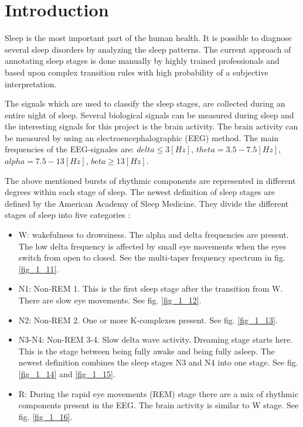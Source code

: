 \section{Introduction}
\label{sec:intro}

Sleep is the most important part of the human health. It is possible to diagnose several sleep disorders by analyzing the sleep patterns.
The current approach of annotating sleep stages is done manually by highly trained professionals and based upon complex transition rules with high probability of a subjective interpretation.

The signals which are used to classify the sleep stages, are collected during an entire night of sleep. Several biological signals can be measured during sleep and the interesting signals for this project is the brain activity. The brain activity can be measured by using an electroencephalographic (EEG) method. 
The main frequencies of the EEG-signales are: $delta \le 3 \left[ Hz \right]$, 
$theta= 3.5-7.5 \left[ Hz \right]$,
$alpha= 7.5-13 \left[ Hz \right]$, 
$beta \ge 13 \left[ Hz \right]$.

The above mentioned bursts of rhythmic components are represented in different degrees within each stage of sleep.   
The newest definition of sleep stages are defined by the American Academy of Sleep Medicine. They divide the different stages of sleep into five categories \cite{main_ar, AASM}: 
\begin{itemize}
\item W: wakefulness to drowsiness. The alpha and delta frequencies are present. The low delta frequency is affected by small eye movements when the eyes switch from open to closed. See the multi-taper frequency spectrum in fig. \ref{fig_1_11}.
\item N1: Non-REM 1. This is the first sleep stage after the transition from W. There are slow eye movements. See fig. \ref{fig_1_12}.
\item N2: Non-REM 2. One or more K-complexes present. See fig. \ref{fig_1_13}.
\item N3-N4: Non-REM 3-4. Slow delta wave activity. Dreaming stage starts here. This is the stage between being fully awake and being fully asleep. The newest definition combines the sleep stages N3 and N4 into one stage. See fig. \ref{fig_1_14} and \ref{fig_1_15}.
\item R: During the rapid eye movements (REM) stage there are a mix of rhythmic components present in the EEG. The brain activity is similar to W stage. See fig. \ref{fig_1_16}.
\end{itemize} 

